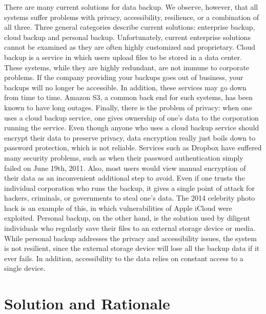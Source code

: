 There are many current solutions for data backup. We observe, however, that all systems suffer problems with privacy, accessibility, resilience, or a combination of all three. Three general categories describe current solutions: enterprise backup, cloud backup and personal backup. Unfortunately, current enterprise solutions cannot be examined as they are often highly customized and proprietary. Cloud backup is a service in which users upload files to be stored in a data center. These systems, while they are highly redundant, are not immune to corporate problems. If the company providing your backups goes out of business, your backups will no longer be accessible. In addition, these services may go down from time to time. Amazon S3, a common back end for such systems, has been known to have long outages. \cite{gigaom} \cite{rightscale} Finally, there is the problem of privacy: when one uses a cloud backup service, one gives ownership of one's data to the corporation running the service.  Even though anyone who uses a cloud backup service should encrypt their data to preserve privacy, data encryption really just boils down to password protection, which is not reliable. \cite{password} Services such as Dropbox have suffered many security problems, such as when their password authentication simply failed on June 19th, 2011. \cite{dropbox_fail}  Also, most users would view manual encryption of their data as an inconvenient additional step to avoid.  Even if one trusts the individual corporation who runs the backup, it gives a single point of attack for hackers, criminals, or governments to steal one's data.  The 2014 celebrity photo hack is an example of this, in which vulnerabilities of Apple iCloud were exploited. \cite{theguardian}  Personal backup, on the other hand, is the solution used by diligent individuals who regularly save their files to an external storage device or media. While personal backup addresses the privacy and accessibility issues, the system is not resilient, since the external storage device will lose all the backup data if it ever fails. \cite{backblaze} In addition, accessibility to the data relies on constant access to a single device.


\section{Solution and Rationale}

